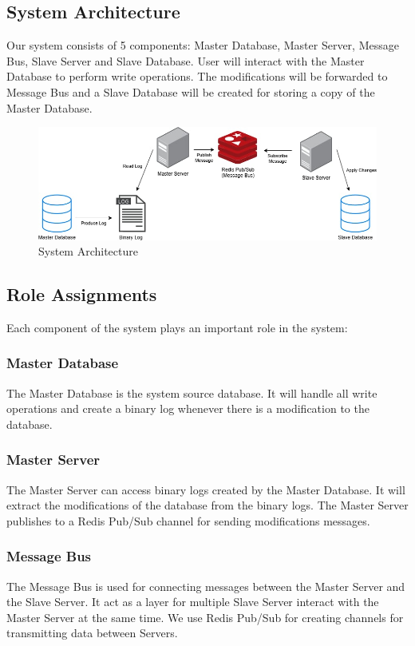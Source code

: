 \documentclass[a4paper,12pt]{report}
\begin{document}
\subsection{System Architecture}
Our system consists of 5 components: Master Database, Master Server, Message Bus, Slave Server and Slave Database. User will interact with the Master Database to perform write operations. The modifications will be forwarded to Message Bus and a Slave Database will be created for storing a copy of the Master Database.

\begin{figure}[h!]
    \centering
    \includegraphics[width=\textwidth]{distribute_system_architecture.png}
    \caption{System Architecture}
    \label{fig:system_architecture}
\end{figure}

\subsection{Role Assignments}

Each component of the system plays an important role in the system:

\subsubsection{Master Database}
The Master Database is the system source database. It will handle all write operations and create a binary log whenever there is a modification to the database.

\subsubsection{Master Server}
The Master Server can access binary logs created by the Master Database. It will extract the modifications of the database from the binary logs. The Master Server publishes to a Redis Pub/Sub channel for sending modifications messages.

\subsubsection{Message Bus}
The Message Bus is used for connecting messages between the Master Server and the Slave Server. It act as a layer for multiple Slave Server interact with the Master Server at the same time. We use Redis Pub/Sub for creating channels for transmitting data between Servers.
\end{document}
